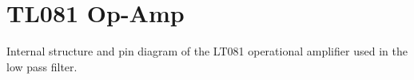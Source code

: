 \section{TL081 Op-Amp}
\label{app:lt081}
Internal structure and pin diagram of the LT081 operational amplifier used in the low pass filter\cite{TL081}.
\begin{figure}[h!]
\centering
{}
\label{fig:subfigureExample}
\end{figure}
